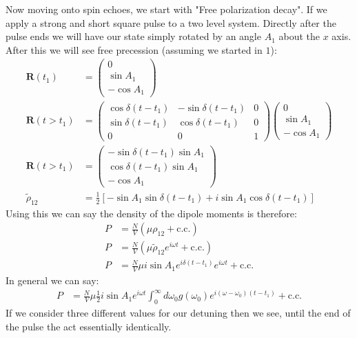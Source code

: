 Now moving onto spin echoes, we start with "Free polarization decay". If we apply a strong and short square pulse to a two level system.
Directly after the pulse ends we will have our state simply rotated by an angle $A_1$ about the $x$ axis. After this we will see free precession (assuming we started in $1$):
\begin{align*}
	\bm{R}(t_1) &= \begin{pmatrix}
		0 \\
		\sin A_1 \\
		-\cos A_1
		       \end{pmatrix} \\
	\bm{R}(t > t_1) &= \begin{pmatrix}
		\cos\delta(t-t_1) & -\sin\delta(t-t_1) & 0 \\
		\sin\delta(t-t_1) & \cos\delta(t-t_1) & 0 \\
		0 & 0 & 1
			   \end{pmatrix}
	\begin{pmatrix}
		0 \\
		\sin A_1 \\
		-\cos A_1
		       \end{pmatrix} \\
	\bm{R}(t>t_1) &= \begin{pmatrix}
		-\sin\delta(t-t_1)\sin A_1 \\
		\cos\delta(t-t_1)\sin A_1 \\
		-\cos A_1
			 \end{pmatrix} \\
	\tilde{\rho}_{12} &= \frac{1}{2}\left[-\sin A_1 \sin \delta(t - t_1) + i\sin A_1 \cos\delta(t-t_1)\right]
\end{align*}
Using this we can say the density of the dipole moments is therefore:
\begin{align*}
	P &= \frac{N}{V}(\mu \rho_{12} + \text{c.c.}) \\
	P &= \frac{N}{V}(\mu \tilde{\rho}_{12}e^{i\omega t} + \text{c.c.}) \\
	P &= \frac{N}{V}\mu i\sin A_1 e^{i\delta(t - t_1)} e^{i\omega t} + \text{c.c.}
\end{align*}
In general we can say:
\begin{align*}
	P &= \frac{N}{V} \mu \frac{1}{2} i\sin A_1 e^{i\omega t}\int_0^\infty d\omega_0 g(\omega_0) e^{i(\omega-\omega_0)(t-t_1)} + \text{c.c.}
\end{align*}
If we consider three different values for our detuning then we see, until the end of the pulse the act essentially identically.
